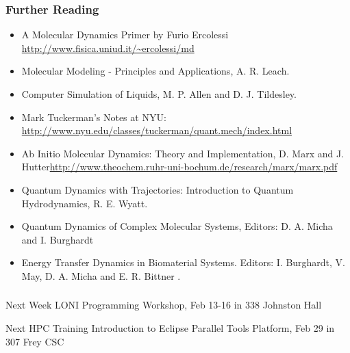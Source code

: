 \documentclass[slidestop,mathserif,compress,xcolor=svgnames]{beamer}
\newenvironment{bblock}[0]
{
\begin{beamerboxesrounded}[upper=uppercol1,lower=lowercol1,shadow=true]}
{\end{beamerboxesrounded}}
\newenvironment{eblock}[0]
{
\begin{beamerboxesrounded}[upper=uppercol2,lower=lowercol2,shadow=true]}
{\end{beamerboxesrounded}}
\begin{document}
\begin{frame}
  \frametitle{\small Further Reading}
  \begin{bblock}{}
    \begin{itemize}
      \item A Molecular Dynamics Primer by Furio Ercolessi {\color{Blue}\url{http://www.fisica.uniud.it/~ercolessi/md}}
      \item Molecular Modeling - Principles and Applications, A. R. Leach.
      \item Computer Simulation of Liquids, M. P. Allen and D. J. Tildesley.
      \item Mark Tuckerman's Notes at NYU: {\color{Blue}\url{http://www.nyu.edu/classes/tuckerman/quant.mech/index.html}}
      \item Ab Initio Molecular Dynamics: Theory and Implementation, D. Marx and J. Hutter{\color{Blue}\url{http://www.theochem.ruhr-uni-bochum.de/research/marx/marx.pdf}}
      \item Quantum Dynamics with Trajectories: Introduction to Quantum Hydrodynamics, R. E. Wyatt.
      \item Quantum Dynamics of Complex Molecular Systems, Editors: D. A. Micha and I. Burghardt
      \item Energy Transfer Dynamics in Biomaterial Systems. Editors: I. Burghardt, V. May, D. A. Micha and E. R. Bittner .
    \end{itemize}
  \end{bblock}
\end{frame}

\begin{frame}
  \frametitle{\small }
  \begin{eblock}{Next Week}
    LONI Programming Workshop, Feb 13-16 in 338 Johnston Hall
  \end{eblock}

  \begin{eblock}{Next HPC Training}
    Introduction to Eclipse Parallel Tools Platform, Feb 29 in 307 Frey CSC
  \end{eblock}
\end{frame}
\end{document}
